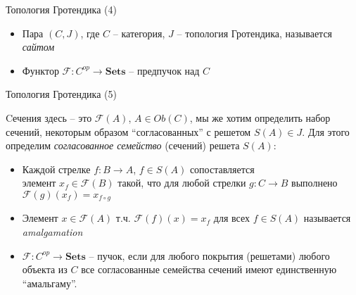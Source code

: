 \documentclass{beamer}
\begin{document}
\begin{frame}{Топология Гротендика (4)}
\begin{small}
\bigskip
\begin{itemize}
	\item Пара $(C, J)$, где $C$ -- категория, $J$ -- топология Гротендика, называется \textit{сайтом}
	\item Функтор $\mathcal{F} : C^{op} \to \textbf{Sets}$ -- предпучок над $C$
\end{itemize}
\end{small}
\end{frame}

\begin{frame}{Топология Гротендика (5)}
\begin{small}
Cечения здесь -- это $\mathcal{F}(A)$, $A \in Ob(C)$, мы же хотим определить набор сечений, некоторым образом ``согласованных'' с решетом $S(A) \in J$. Для этого определим \textit{согласованное семейство} (сечений) решета $S(A)$:
\bigskip
\begin{itemize}
	\item Каждой стрелке $f : B \to A$, $f \in S(A)$ сопоставляется \\элемент $x_f \in \mathcal{F}(B)$ такой, что для любой стрелки $g : C \to B$ выполнено	$\mathcal{F}(g)(x_f) = x_{f \circ g}$
	\item Элемент $x \in \mathcal{F}(A)$ т.ч. $\mathcal{F}(f)(x) = x_f$ для всех $f \in S(A)$ называется \textit{amalgamation}
	\item $\mathcal{F} : C^{op} \to \textbf{Sets}$ -- пучок, если для любого покрытия (решетами) любого объекта из $C$ все согласованные семейства сечений имеют единственную ``амальгаму''.
\end{itemize}
\end{small}
\end{frame}
\end{document}

